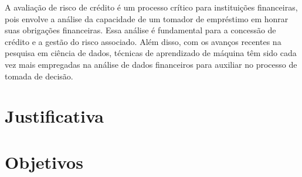 A avaliação de risco de crédito é um processo crítico para instituições
financeiras, pois envolve a análise da capacidade de um tomador de empréstimo em
honrar suas obrigações financeiras. Essa análise é fundamental para a concessão
de crédito e a gestão do risco associado. Além disso, com os avanços recentes na
pesquisa em ciência de dados, técnicas de aprendizado de máquina têm
sido cada vez mais empregadas na análise de dados financeiros para
auxiliar no processo de tomada de decisão.

\section{Justificativa}\label{sec:motivacao}


\section{Objetivos}\label{sec:objetivos}

